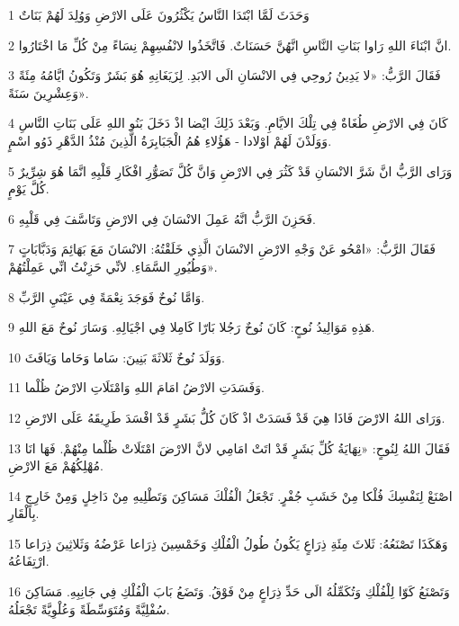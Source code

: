 \par 1 وَحَدَثَ لَمَّا ابْتَدَا النَّاسُ يَكْثُرُونَ عَلَى الارْضِ وَوُلِدَ لَهُمْ بَنَاتٌ
\par 2 انَّ ابْنَاءَ اللهِ رَاوا بَنَاتِ النَّاسِ انَّهُنَّ حَسَنَاتٌ. فَاتَّخَذُوا لانْفُسِهِمْ نِسَاءً مِنْ كُلِّ مَا اخْتَارُوا.
\par 3 فَقَالَ الرَّبُّ: «لا يَدِينُ رُوحِي فِي الانْسَانِ الَى الابَدِ. لِزَيَغَانِهِ هُوَ بَشَرٌ وَتَكُونُ ايَّامُهُ مِئَةً وَعِشْرِينَ سَنَةً».
\par 4 كَانَ فِي الارْضِ طُغَاةٌ فِي تِلْكَ الايَّامِ. وَبَعْدَ ذَلِكَ ايْضا اذْ دَخَلَ بَنُو اللهِ عَلَى بَنَاتِ النَّاسِ وَوَلَدْنَ لَهُمْ اوْلادا - هَؤُلاءِ هُمُ الْجَبَابِرَةُ الَّذِينَ مُنْذُ الدَّهْرِ ذَوُو اسْمٍ.
\par 5 وَرَاى الرَّبُّ انَّ شَرَّ الانْسَانِ قَدْ كَثُرَ فِي الارْضِ وَانَّ كُلَّ تَصَوُّرِ افْكَارِ قَلْبِهِ انَّمَا هُوَ شِرِّيرٌ كُلَّ يَوْمٍ.
\par 6 فَحَزِنَ الرَّبُّ انَّهُ عَمِلَ الانْسَانَ فِي الارْضِ وَتَاسَّفَ فِي قَلْبِهِ.
\par 7 فَقَالَ الرَّبُّ: «امْحُو عَنْ وَجْهِ الارْضِ الانْسَانَ الَّذِي خَلَقْتُهُ: الانْسَانَ مَعَ بَهَائِمَ وَدَبَّابَاتٍ وَطُيُورِ السَّمَاءِ. لانِّي حَزِنْتُ انِّي عَمِلْتُهُمْ».
\par 8 وَامَّا نُوحٌ فَوَجَدَ نِعْمَةً فِي عَيْنَيِ الرَّبِّ.
\par 9 هَذِهِ مَوَالِيدُ نُوحٍ: كَانَ نُوحٌ رَجُلا بَارّا كَامِلا فِي اجْيَالِهِ. وَسَارَ نُوحٌ مَعَ اللهِ.
\par 10 وَوَلَدَ نُوحٌ ثَلاثَةَ بَنِينَ: سَاما وَحَاما وَيَافَثَ.
\par 11 وَفَسَدَتِ الارْضُ امَامَ اللهِ وَامْتَلَاتِ الارْضُ ظُلْما.
\par 12 وَرَاى اللهُ الارْضَ فَاذَا هِيَ قَدْ فَسَدَتْ اذْ كَانَ كُلُّ بَشَرٍ قَدْ افْسَدَ طَرِيقَهُ عَلَى الارْضِ.
\par 13 فَقَالَ اللهُ لِنُوحٍ: «نِهَايَةُ كُلِّ بَشَرٍ قَدْ اتَتْ امَامِي لانَّ الارْضَ امْتَلَاتْ ظُلْما مِنْهُمْ. فَهَا انَا مُهْلِكُهُمْ مَعَ الارْضِ.
\par 14 اصْنَعْ لِنَفْسِكَ فُلْكا مِنْ خَشَبِ جُفْرٍ. تَجْعَلُ الْفُلْكَ مَسَاكِنَ وَتَطْلِيهِ مِنْ دَاخِلٍ وَمِنْ خَارِجٍ بِالْقَارِ.
\par 15 وَهَكَذَا تَصْنَعُهُ: ثَلاثَ مِئَةِ ذِرَاعٍ يَكُونُ طُولُ الْفُلْكِ وَخَمْسِينَ ذِرَاعا عَرْضُهُ وَثَلاثِينَ ذِرَاعا ارْتِفَاعُهُ.
\par 16 وَتَصْنَعُ كَوّا لِلْفُلْكِ وَتُكَمِّلُهُ الَى حَدِّ ذِرَاعٍ مِنْ فَوْقُ. وَتَضَعُ بَابَ الْفُلْكِ فِي جَانِبِهِ. مَسَاكِنَ سُفْلِيَّةً وَمُتَوَسِّطَةً وَعُلْوِيَّةً تَجْعَلُهُ.
